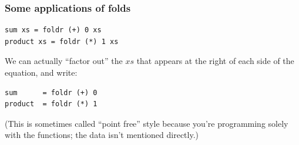 \documentclass{beamer}
\begin{document}
\begin{frame}[fragile]
\frametitle{Some applications of folds}

\begin{verbatim}
sum xs = foldr (+) 0 xs
product xs = foldr (*) 1 xs
\end{verbatim}

We can actually ``factor out'' the $xs$ that appears at the right
of each side of the equation, and write:

\begin{verbatim}
sum      = foldr (+) 0
product  = foldr (*) 1
\end{verbatim}

(This is sometimes called ``point free'' style because you're
programming solely with the functions; the data isn't mentioned
directly.)

\end{frame}
%




\end{document}
